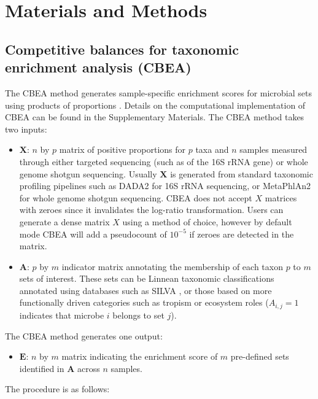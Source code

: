\documentclass[10pt,letterpaper]{article}
\begin{document}
\section*{Materials and Methods} \label{methods}
\subsection*{Competitive balances for taxonomic enrichment analysis (CBEA)}
The CBEA method generates sample-specific enrichment scores for microbial sets using products of proportions \cite{egozcue2003}. Details on the computational implementation of CBEA can be found in the Supplementary Materials. The CBEA method takes two inputs:  
\begin{itemize}
    \item $\mathbf{X}$: $n$ by $p$ matrix of positive proportions for $p$ taxa and $n$ samples measured through either targeted sequencing (such as of the 16S rRNA gene) or whole genome shotgun sequencing. Usually $\mathbf{X}$ is generated from standard taxonomic profiling pipelines such as DADA2 \cite{callahan2016} for 16S rRNA sequencing, or MetaPhlAn2 \cite{truong2015} for whole genome shotgun sequencing. CBEA does not accept $X$ matrices with zeroes since it invalidates the log-ratio transformation. Users can generate a dense matrix $X$ using a method of choice, however by default mode CBEA will add a pseudocount of $10^{-5}$ if zeroes are detected in the matrix. 
    \item $\mathbf{A}$: $p$ by $m$ indicator matrix annotating the membership of each taxon $p$ to $m$ sets of interest. These sets can be Linnean taxonomic classifications annotated using databases such as SILVA \cite{quast2013}, or those based on more functionally driven categories such as tropism or ecosystem roles ($A_{i,j} = 1$ indicates that microbe $i$ belongs to set $j$). 
\end{itemize}
The CBEA method generates one output:  
\begin{itemize} 
    \item $\mathbf{E}$: $n$ by $m$ matrix indicating the enrichment score of $m$ pre-defined sets identified in $\mathbf{A}$ across $n$ samples. 
\end{itemize}
The procedure is as follows:  
\end{document}
